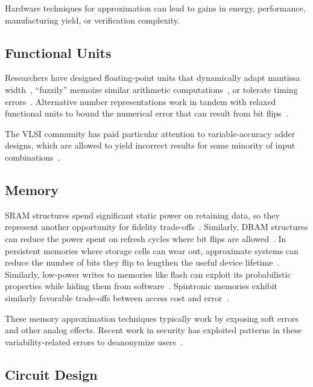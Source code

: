 Hardware techniques for approximation can lead to gains in energy, performance, manufacturing
yield, or verification complexity.

\subsection{Functional Units}

Researchers have designed floating-point units
that dynamically adapt mantissa width~\cite{bitwidthred, hierarchfpu}, ``fuzzily'' memoize
similar arithmetic computations~\cite{fuzzymemo}, or tolerate timing
errors~\cite{kumarhpca, hizli, metafunctions}.
Alternative number
representations work in tandem with relaxed functional units to bound the
numerical error that can result from bit flips~\cite{stanleymarbell}.

The VLSI community has paid particular attention to variable-accuracy adder
designs, which are allowed to yield incorrect results for some minority of
input combinations~\cite{uva-adder, palem-adders, impact, adder-metrics,
configurable-adder, adder-iccad13, adder-tcad, adder-optimal, adder-dac12,
adder-isic09, adder-date08}.

\subsection{Memory}

SRAM
structures spend significant static power on retaining data, so they represent
another opportunity for fidelity trade-offs~\cite{hybrid-sram, sramerrors,
partially-forgetful}. Similarly,
DRAM structures can reduce the power spent on refresh cycles where bit flips
are allowed~\cite{flikker, sparkk}.
In persistent memories where storage cells can wear out, approximate systems
can reduce the number of bits they flip to lengthen the useful device
lifetime~\cite{fang-pcm}.
Similarly, low-power writes to memories like flash can exploit its
probabilistic properties while hiding them from software~\cite{halfwits,
powerfade, flash-retention-relax}.
Spintronic memories exhibit similarly favorable trade-offs between access cost
and error~\cite{spintronic-approx}.

These memory approximation techniques typically
work by exposing
soft errors and other analog effects.
Recent work in security has exploited patterns in these variability-related
errors to deanonymize users~\cite{deanondram}.

\subsection{Circuit Design}

